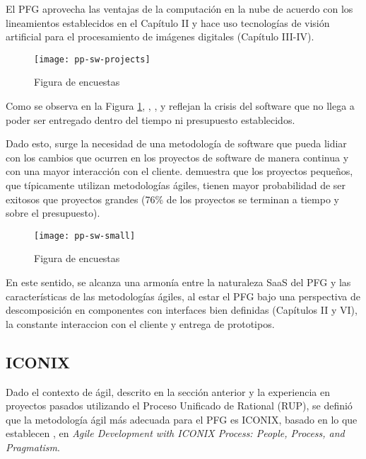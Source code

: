 El PFG aprovecha las ventajas de la computación en la nube de acuerdo con los lineamientos establecidos en el Capítulo II y hace uso tecnologías de visión artificial para el procesamiento de imágenes digitales (Capítulo III-IV). 

    \begin{figure}[H]
        \centering
        \texttt{[image: pp-sw-projects]}
        \caption{Figura de encuestas \protect\cite{Fox2013-ct}}
        \label{fig:pp-sw-projects}
    \end{figure}

Como se observa en la Figura \ref{fig:pp-sw-projects}, , ,  y  reflejan la crisis del software que no llega a poder ser entregado dentro del tiempo ni presupuesto establecidos. 

Dado esto, surge la necesidad de una metodología de software que pueda lidiar con los cambios que ocurren en los proyectos de software de manera continua y con una mayor interacción con el cliente.  demuestra que los proyectos pequeños, que típicamente utilizan metodologías ágiles, tienen mayor probabilidad de ser exitosos que proyectos grandes (76\% de los proyectos se terminan a tiempo y sobre el presupuesto). 
    
    \begin{figure}[H]
            \centering
            \texttt{[image: pp-sw-small]}
            \caption{Figura de encuestas \protect\cite{Fox2013-ct}}
            \label{fig:pp-sw-small}
        \end{figure}

En este sentido, se alcanza una armonía entre la naturaleza SaaS del PFG y las características de las metodologías ágiles, al estar el PFG  bajo una perspectiva de descomposición en componentes con interfaces bien definidas (Capítulos II y VI), la constante interaccion con el cliente y entrega de prototipos.

\subsection{ICONIX}
Dado el contexto de ágil, descrito en la sección anterior y la experiencia en proyectos pasados utilizando el Proceso Unificado de Rational (RUP), se definió que la metodología ágil más adecuada para el PFG es ICONIX, basado en lo que establecen , en \textit{Agile Development with ICONIX Process: People, Process, and Pragmatism}. 

